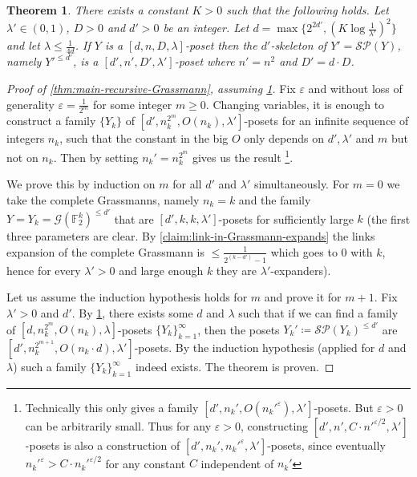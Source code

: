 \documentclass[10pt,a4paper]{article}
\newcommand{\prettyref}[1]{\cref{#1}}
\newtheorem{theorem}{Theorem}[section]
\theoremstyle{definition}
\theoremstyle{remark}
\newcommand{\set}[1]{\{#1\}}
\renewcommand{\leq}{\leqslant}
\renewcommand{\geq}{\geqslant}
\numberwithin{equation}{section}
\let\pref=\prettyref
\def\Gr{\mathcal{G}}
\def\Y{Y}
\def\diml{d}
\def\dimlin{{\diml}}
\def\dimlout{\diml'}
\def\lambdai{\lambda}
\def\lambdao{\lambda'}
\def\degree{D}
\def\M{\mathcal{SP}}
\begin{document}
\begin{theorem}\label{thm:one-step-of-recursion}
    There exists a constant \(K > 0\) such that the following holds. Let \(\lambdao \in (0,1)\), \(D > 0\) and \(\dimlout >0\) be an integer. Let \(\dimlin = \max \set{2^{2\dimlout},\left (K \log \frac{1}{\lambdao} \right )^2}\) and let \(\lambdai \leq \frac{1}{4\dimlin}\). If \(\Y\) is a \([\dimlin, n, \degree, \lambdai]\)-poset then the \(\dimlout\)-skeleton of \(\Y' = \M(\Y)\), namely \(\Y'^{\leq \dimlout}\), is a \([\dimlout, n', \degree ' , \lambdao]\)-poset where \(n' = n^2\) and \(\degree' = \dimlin \cdot \degree\).
\end{theorem}

\begin{proof}[Proof of \pref{thm:main-recursive-Grassmann}, assuming \pref{thm:one-step-of-recursion}]
    Fix \(\varepsilon\) and without loss of generality \(\varepsilon = \frac{1}{2^m}\) for some integer \(m \geq 0\). Changing variables, it is enough to construct a family \(\set{Y_k}\) of \([\dimlout,n_k^{2^m},O(n_k),\lambdao]\)-posets for an infinite sequence of integers \(n_k\), such that the constant in the big \(O\) only depends on \(\dimlout,\lambdao\) and \(m\) but not on \(n_k\). Then by setting \(n_k' = n_k^{2^m}\) gives us the result \footnote{Technically this only gives a family \([\dimlout,n_k',O(n_k'^\varepsilon),\lambdao]\)-posets. But \(\varepsilon > 0\) can be arbitrarily small. Thus for any \(\varepsilon > 0\), constructing \([\dimlout,n',C \cdot n'^{\varepsilon/2},\lambdao]\)-posets is also a construction of \([\dimlout,n_k',n_k'^{\varepsilon},\lambdao]\)-posets, since eventually \(n_k'^{\varepsilon} > C \cdot n_k'^{\varepsilon/2}\) for any constant \(C\) independent of \(n_k'\)}.
    
    We prove this by induction on \(m\) for all \(\dimlout\) and \(\lambdao\) simultaneously. For \(m=0\) we take the complete Grassmanns, namely \(n_k = k\) and the family \(\Y =\Y_k = \Gr(\mathbb{F}_2^k)^{\leq \dimlout}\) that are \([\dimlout,k,k,\lambdao]\)-posets for sufficiently large \(k\) (the first three parameters are clear. By \pref{claim:link-in-Grassmann-expands} the links expansion of the complete Grassmann is \(\leq \frac{1}{2^{(k-\dimlout)}-1}\) which goes to \(0\) with \(k\), hence for every \(\lambdao > 0\) and large enough \(k\) they are \(\lambdao\)-expanders).
    
    Let us assume the induction hypothesis holds for \(m\) and prove it for \(m+1\). Fix \(\lambdao > 0\) and \(\dimlout\). By \pref{thm:one-step-of-recursion}, there exists some \(\dimlin\) and \(\lambdai\) such that if we can find a family of \([\dimlin, n_k^{2^m},O(n_k),\lambdai]\)-posets \(\set{\Y_k}_{k=1}^\infty\), then the posets \(\Y_k' \coloneqq \M(Y_k)^{\leq \dimlout}\) are \([\dimlout, n_k^{2^{m+1}},O(n_k \cdot \dimlin),\lambdao]\)-posets. By the induction hypothesis (applied for \(\dimlin\) and \(\lambdai\)) such a family \(\set{\Y_k}_{k=1}^\infty\) indeed exists. The theorem is proven.%
\end{proof}
\end{document}
